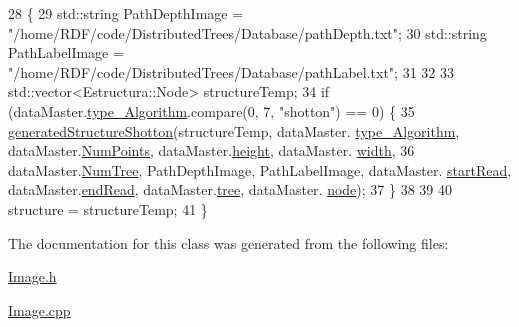 \begin{DoxyCode}
28                                                                                               \{
29     std::string PathDepthImage = \textcolor{stringliteral}{"/home/RDF/code/DistributedTrees/Database/pathDepth.txt"};
30     std::string PathLabelImage = \textcolor{stringliteral}{"/home/RDF/code/DistributedTrees/Database/pathLabel.txt"};
31 
32 
33     std::vector<Estructura::Node> structureTemp;
34     \textcolor{keywordflow}{if} (dataMaster.\hyperlink{structEstructura_1_1DataMaster_accae7ba56def5fd845b33cb8cfb384fe}{type\_Algorithm}.compare(0, 7, \textcolor{stringliteral}{"shotton"}) == 0) \{
35         \hyperlink{classImage_acc132bd92aec2c6186937566b593aafc}{generatedStructureShotton}(structureTemp, dataMaster.
      \hyperlink{structEstructura_1_1DataMaster_accae7ba56def5fd845b33cb8cfb384fe}{type\_Algorithm}, dataMaster.\hyperlink{structEstructura_1_1DataMaster_ad62760f62256a3fbd88481f720b81851}{NumPoints}, dataMaster.\hyperlink{structEstructura_1_1DataMaster_a33df1604c867e22af955f29c453d6651}{height}, dataMaster.
      \hyperlink{structEstructura_1_1DataMaster_a52e88b0d0d52d7e61880e3689ef2e638}{width},
36                 dataMaster.\hyperlink{structEstructura_1_1DataMaster_a950938f474870649fe7eceae940366fd}{NumTree}, PathDepthImage, PathLabelImage, dataMaster.
      \hyperlink{structEstructura_1_1DataMaster_ada49eb1401a3715858043ebd2b61c10c}{startRead}, dataMaster.\hyperlink{structEstructura_1_1DataMaster_a787807eccc80c8e639d2409477f37f3a}{endRead}, dataMaster.\hyperlink{structEstructura_1_1DataMaster_a766b1b437e0f242d3626a3759bef8b43}{tree}, dataMaster.
      \hyperlink{structEstructura_1_1DataMaster_a5b7bf8e1c983ad0a64dd596d1bb4e31a}{node});
37     \}
38 
39 
40     structure = structureTemp;
41 \}
\end{DoxyCode}


The documentation for this class was generated from the following files\+:\begin{DoxyCompactItemize}
\item 
\hyperlink{Image_8h}{Image.\+h}\item 
\hyperlink{Image_8cpp}{Image.\+cpp}\end{DoxyCompactItemize}
